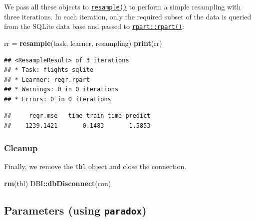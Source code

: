 \documentclass[]{article}
\newenvironment{Shaded}{\begin{snugshade}}{\end{snugshade}}
\newcommand{\KeywordTok}[1]{\textcolor[rgb]{0.13,0.29,0.53}{\textbf{#1}}}
\newcommand{\NormalTok}[1]{#1}
\newcommand{\OperatorTok}[1]{\textcolor[rgb]{0.81,0.36,0.00}{\textbf{#1}}}
\newcommand{\StringTok}[1]{\textcolor[rgb]{0.31,0.60,0.02}{#1}}
\renewenvironment{Shaded} {\begin{snugshade}\small} {\end{snugshade}}
\begin{document}
We pass all these objects to \href{https://mlr3.mlr-org.com/reference/resample.html}{\texttt{resample()}} to perform a simple resampling with three iterations.
In each iteration, only the required subset of the data is queried from the SQLite data base and passed to \href{https://www.rdocumentation.org/packages/rpart/topics/rpart}{\texttt{rpart::rpart()}}:

\begin{Shaded}
\begin{Highlighting}[]
\NormalTok{rr =}\StringTok{ }\KeywordTok{resample}\NormalTok{(task, learner, resampling)}
\KeywordTok{print}\NormalTok{(rr)}
\end{Highlighting}
\end{Shaded}

\begin{verbatim}
## <ResampleResult> of 3 iterations
## * Task: flights_sqlite
## * Learner: regr.rpart
## * Warnings: 0 in 0 iterations
## * Errors: 0 in 0 iterations
\end{verbatim}

\begin{Shaded}
\end{Shaded}

\begin{verbatim}
##     regr.mse   time_train time_predict 
##    1239.1421       0.1483       1.5853
\end{verbatim}

\hypertarget{cleanup}{%
\subsubsection{Cleanup}\label{cleanup}}

Finally, we remove the \texttt{tbl} object and close the connection.

\begin{Shaded}
\begin{Highlighting}[]
\KeywordTok{rm}\NormalTok{(tbl)}
\NormalTok{DBI}\OperatorTok{::}\KeywordTok{dbDisconnect}\NormalTok{(con)}
\end{Highlighting}
\end{Shaded}

\hypertarget{paradox}{%
\subsection{\texorpdfstring{Parameters (using \texttt{paradox})}{Parameters (using paradox)}}\label{paradox}}
\end{document}
